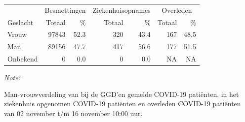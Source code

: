 \documentclass[
  english,
  man,floatsintext]{apa6}
\begin{document}
\begin{table}
\centering\begingroup\fontsize{11}{13}\selectfont

\begin{threeparttable}
\begin{tabular}{lrrrrrr}
\toprule
\multicolumn{1}{c}{ } & \multicolumn{2}{c}{Besmettingen} & \multicolumn{2}{c}{Ziekenhuisopnames} & \multicolumn{2}{c}{Overleden} \\
\cmidrule(l{3pt}r{3pt}){2-3} \cmidrule(l{3pt}r{3pt}){4-5} \cmidrule(l{3pt}r{3pt}){6-7}
Geslacht & Totaal & \% & Totaal & \% & Totaal & \%\\
\midrule
Vrouw & 97843 & 52.3 & 320 & 43.4 & 167 & 48.5\\
Man & 89156 & 47.7 & 417 & 56.6 & 177 & 51.5\\
Onbekend & 0 & 0.0 & 0 & 0.0 & NA & NA\\
\bottomrule
\end{tabular}
\begin{tablenotes}
\item \textit{Note: } 
\item Man-vrouwverdeling van bij de GGD’en gemelde COVID-19 patiënten, in het ziekenhuis opgenomen COVID-19 patiënten en overleden COVID-19 patiënten van 02 november t/m 16 november 10:00 uur.
\end{tablenotes}
\end{threeparttable}
\endgroup{}
\end{table}
\newpage
\end{document}
